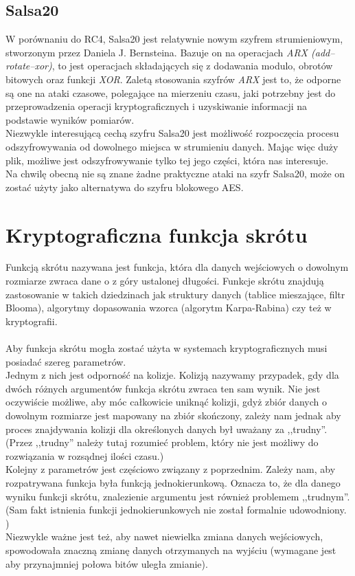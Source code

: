 \subsection{Salsa20}
W porównaniu do RC4, Salsa20 jest relatywnie nowym szyfrem strumieniowym, stworzonym przez Daniela J. Bernsteina. 
Bazuje on na operacjach \textit{ARX (add–rotate–xor)}, to jest operacjach składających się z dodawania modulo, obrotów bitowych oraz funkcji \textit{XOR}. 
Zaletą stosowania szyfrów \textit{ARX} jest to, że odporne są one na ataki czasowe, 
polegające na mierzeniu czasu, jaki potrzebny jest do przeprowadzenia operacji kryptograficznych i uzyskiwanie informacji na podstawie wyników pomiarów. \\
Niezwykle interesującą cechą szyfru Salsa20 jest możliwość rozpoczęcia procesu odszyfrowywania od dowolnego miejsca w strumieniu danych. Mając więc duży plik, możliwe jest odszyfrowywanie tylko tej jego części, która nas interesuje. \\
Na chwilę obecną nie są znane żadne praktyczne ataki na szyfr Salsa20, może on zostać użyty jako alternatywa do szyfru blokowego AES.

\section{Kryptograficzna funkcja skrótu}
Funkcją skrótu nazywana jest funkcja, która dla danych wejściowych o dowolnym rozmiarze zwraca dane o z góry ustalonej długości. Funkcje skrótu znajdują zastosowanie w takich dziedzinach jak struktury danych (tablice mieszające, filtr Blooma), algorytmy dopasowania wzorca (algorytm Karpa-Rabina) czy też w kryptografii. \\ \\
Aby funkcja skrótu mogła zostać użyta w systemach kryptograficznych musi posiadać szereg parametrów. \\
Jednym z nich jest odporność na kolizje. Kolizją nazywamy przypadek, gdy dla dwóch różnych argumentów funkcja skrótu zwraca ten sam wynik. Nie jest oczywiście możliwe, aby móc całkowicie uniknąć kolizji, gdyż zbiór danych o dowolnym rozmiarze jest mapowany na zbiór skończony, zależy nam jednak aby proces znajdywania kolizji dla określonych danych był uważany za ,,trudny''. (Przez ,,trudny'' należy tutaj rozumieć problem, który nie jest możliwy do rozwiązania w rozsądnej ilości czasu.) \\
Kolejny z parametrów jest częściowo związany z poprzednim. Zależy nam, aby rozpatrywana funkcja była funkcją jednokierunkową. Oznacza to, że dla danego wyniku funkcji skrótu, znalezienie argumentu jest również problemem ,,trudnym''.
(Sam fakt istnienia funkcji jednokierunkowych nie został formalnie udowodniony. \cite{oneway}) \\
Niezwykle ważne jest też, aby nawet niewielka zmiana danych wejściowych, spowodowała znaczną zmianę danych otrzymanych na wyjściu (wymagane jest aby przynajmniej połowa bitów uległa zmianie).

